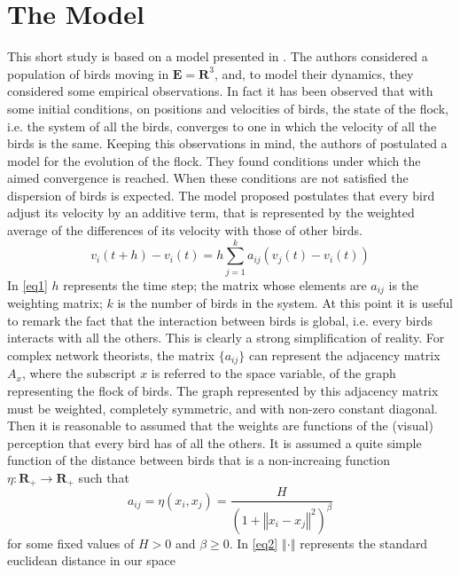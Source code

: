 \documentclass{article} %
\newcounter{other}
\newcounter{math}
\newcounter{late}
\begin{document}
\section {The Model}
This short study is based on a model presented in \cite{CuckerSmale} . The authors considered 
a population of birds moving in $\mathbf{E}=\mathbf{R}^3$, and, to model their dynamics, they
considered some empirical observations. In fact it has been observed that with some
initial conditions, on positions and velocities of birds, the state of the flock, i.e. 
the system of all the birds, converges to one in which the velocity of all the birds is 
the same. Keeping this observations in mind, the authors of \cite{CuckerSmale} postulated a 
model for the evolution of the flock. They found conditions under which the aimed convergence 
is reached. When these conditions are not satisfied the dispersion of birds is expected.
The model proposed postulates that every bird adjust its velocity by an additive term,
that is represented by the weighted average of the differences of its velocity with
those of other birds.
\begin{equation}
	\label{eq1}
	v_i(t+h)-v_i(t)=h\sum_{j=1}^k a_{ij}(v_j(t)-v_i(t))
\end{equation}
In \eqref{eq1} $h$ represents the time step; the matrix whose elements are $a_{ij}$  is 
the weighting matrix; $k$ is the number of birds in the system. At this point it is 
useful to remark the fact that the interaction between birds is global, i.e. every birds
interacts with all the others. This is clearly a strong simplification of reality.
For complex network theorists, the matrix $\lbrace a_{ij}\rbrace$ can represent the adjacency
matrix $A_x$, where the subscript $x$ is referred to the space variable, of the graph
representing the flock of birds. The graph represented by this adjacency matrix must be 
weighted, completely symmetric, and with non-zero constant diagonal.
Then it is reasonable to assumed that the weights are functions of the (visual) 
perception that every bird has of all the others. It is assumed a quite simple function 
of the distance between birds that is a non-increaing function 
$\eta:\mathbf{R}_+\rightarrow\mathbf{R}_+$ such that
\begin{equation}
	\label{eq2}
	a_{ij}=\eta(x_i,x_j)=\frac{H}{(1+\left\Vert x_i - x_j \right\Vert^2)^{\beta}}
\end{equation}
for some fixed values of $H>0$ and $\beta\geq0$. In \eqref{eq2} 
$\left\Vert \cdot \right\Vert$ represents the standard euclidean distance in our space 
\end{document}
